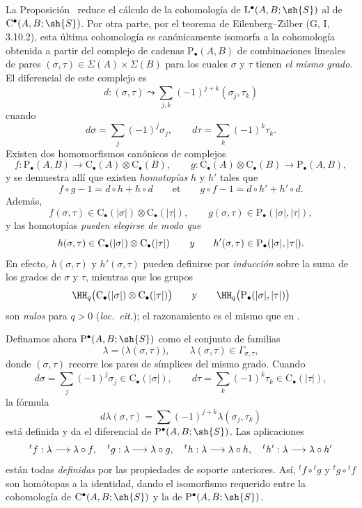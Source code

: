 \documentclass[oneside]{amsart}
\makeatletter
\newcommand{\ega@arrow}[2]{\mathchoice{#1}{#2}{#2}{#2}}
\renewcommand{\to}{\ega@arrow{\longrightarrow}{\rightarrow}}
\newcommand{\oldpage}[2][]{{\marginnote{\normalfont\textbf{#1}~|~#2}}\ignorespaces}
\let\EGAOriginalLabel\label
\renewcommand{\label}[1]{\phantomsection\EGAOriginalLabel{#1}}
\makeatother
\begin{document}
\begin{env}[11.8.6]
\label{0.11.8.6}
\oldpage[0\textsubscript{III}]{45}
La Proposición~ reduce el cálculo de la cohomología de
$\mathrm{L}^\bullet(A,B;\sh{S})$ al de
$\mathrm{C}^\bullet(A,B;\sh{S})$.
Por otra parte, por el teorema de Eilenberg--Zilber
(G, I, 3.10.2), esta última cohomología es canónicamente isomorfa a la
cohomología obtenida a partir del complejo de cadenas
$\mathrm{P}_\bullet(A,B)$ de combinaciones lineales de pares
$(\sigma,\tau)\in\Sigma(A)\times\Sigma(B)$ para los cuales $\sigma$ y
$\tau$ tienen \emph{el mismo grado}.
El diferencial de este complejo es
\[
  d:(\sigma,\tau)
  \leadsto
  \sum_{j,k}(-1)^{j+k}(\sigma_j,\tau_k)
\]
cuando
\[
  d\sigma=\sum_j(-1)^j\sigma_j,
  \qquad
  d\tau=\sum_k(-1)^k\tau_k.
\]
Existen dos homomorfismos canónicos de complejos
\[
  f:\mathrm{P}_\bullet(A,B)
  \longrightarrow
  \mathrm{C}_\bullet(A)\otimes\mathrm{C}_\bullet(B),
  \qquad
  g:\mathrm{C}_\bullet(A)\otimes\mathrm{C}_\bullet(B)
  \longrightarrow
  \mathrm{P}_\bullet(A,B),
\]
y se demuestra allí que existen \emph{homotopías} $h$ y $h'$ tales que
\[
  f\circ g-1=d\circ h+h\circ d\qquad\text{et}
  \qquad
  g\circ f-1=d\circ h'+h'\circ d.
\]
Además,
\[
  f(\sigma,\tau)
  \in
  \mathrm{C}_\bullet(|\sigma|)
  \otimes
  \mathrm{C}_\bullet(|\tau|),
  \qquad
  g(\sigma,\tau)
  \in
  \mathrm{P}_\bullet(|\sigma|,|\tau|),
\]
y las homotopías \emph{pueden elegirse de modo que}
\[
  h(\sigma,\tau)
  \in
  \mathrm{C}_\bullet(|\sigma|)
  \otimes
  \mathrm{C}_\bullet(|\tau|)
  \qquad\emph{y}\qquad
  h'(\sigma,\tau)
  \in
  \mathrm{P}_\bullet(|\sigma|,|\tau|).
\]
En efecto, $h(\sigma,\tau)$ y $h'(\sigma,\tau)$ pueden definirse por
\emph{inducción} sobre la suma de los grados de $\sigma$ y $\tau$, mientras que los grupos
\[
  \HH_q\bigl(
    \mathrm{C}_\bullet(|\sigma|)
    \otimes
    \mathrm{C}_\bullet(|\tau|)
  \bigr)
  \qquad\text{y}\qquad
  \HH_q\bigl(\mathrm{P}_\bullet(|\sigma|,|\tau|)\bigr)
\]
son \emph{nulos} para $q>0$
(\emph{loc.\ cit.}); el razonamiento es el mismo que en
.

Definamos ahora $\mathrm{P}^\bullet(A,B;\sh{S})$ como el conjunto de familias
\[
  \lambda=\bigl(\lambda(\sigma,\tau)\bigr),
  \qquad
  \lambda(\sigma,\tau)\in\Gamma_{\sigma,\tau},
\]
donde $(\sigma,\tau)$ recorre los pares de símplices del mismo grado.
Cuando
\[
  d\sigma=\sum_j(-1)^j\sigma_j\in\mathrm{C}_\bullet(|\sigma|),
  \qquad
  d\tau=\sum_k(-1)^k\tau_k\in\mathrm{C}_\bullet(|\tau|),
\]
la fórmula
\[
  d\lambda(\sigma,\tau)
  =
  \sum(-1)^{j+k}\lambda(\sigma_j,\tau_k)
\]
está definida y da el diferencial de
$\mathrm{P}^\bullet(A,B;\sh{S})$.
Las aplicaciones
\[
  {}^tf:\lambda\to\lambda\circ f,\quad
  {}^tg:\lambda\to\lambda\circ g,\quad
  {}^th:\lambda\to\lambda\circ h,\quad
  {}^th':\lambda\to\lambda\circ h'
\]
están todas \emph{definidas} por las propiedades de soporte anteriores.
Así, ${}^tf\circ{}^tg$ y ${}^tg\circ{}^tf$ son homótopas a la
identidad, dando el isomorfismo requerido entre la cohomología de
$\mathrm{C}^\bullet(A,B;\sh{S})$ y la de
$\mathrm{P}^\bullet(A,B;\sh{S})$.
\end{env}
\end{document}

